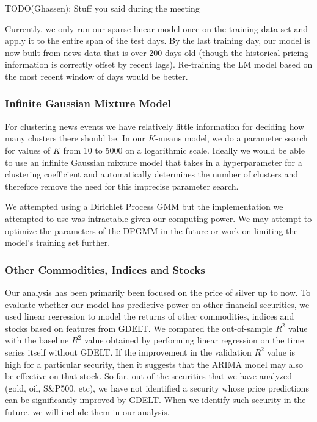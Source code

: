 
TODO(Ghassen): Stuff you said during the meeting

Currently, we only run our sparse linear model once on the training data set and apply it to the entire span of the test days. By the last training day, our model is now built from news data that is over 200 days old (though the historical pricing information is correctly offset by recent lags). Re-training the LM model based on the most recent window of days would be better.

\subsubsection{Infinite Gaussian Mixture Model}
For clustering news events we have relatively little information for deciding how many clusters there should be. In our $K$-means model, we do a parameter search for values of $K$ from 10 to 5000 on a logarithmic scale. Ideally we would be able to use an infinite Gaussian mixture model that takes in a hyperparameter for a clustering coefficient and automatically determines the number of clusters and therefore remove the need for this imprecise parameter search. 

We attempted using a Dirichlet Process GMM but the implementation we attempted to use was intractable given our computing power. We may attempt to optimize the parameters of the DPGMM in the future or work on limiting the model's training set further. 

\subsubsection{Other Commodities, Indices and Stocks}
Our analysis has been primarily been focused on the price of silver up to now. To evaluate whether our model has predictive power on other financial securities, we used linear regression to model the returns of other commodities, indices and stocks based on features from GDELT. We compared the out-of-sample $R^2$ value with the baseline $R^2$ value obtained by performing linear regression on the time series itself without GDELT. If the improvement in the validation $R^2$ value is high for a particular security, then it suggests that the ARIMA model may also be effective on that stock. So far, out of the securities that we have analyzed (gold, oil, S\&P500, etc), we have not identified a security whose price predictions can be significantly improved by GDELT. When we identify such security in the future, we will include them in our analysis.


